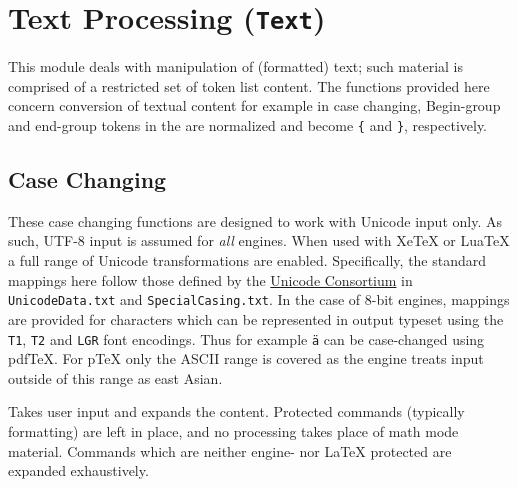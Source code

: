 \documentclass[oneside]{book}
\begin{document}
\chapter{Text Processing (\texttt{Text})}

This module deals with manipulation of (formatted) text; such material is
comprised of a restricted set of token list content. The functions provided
here concern conversion of textual content for example in case changing,
Begin-group and end-group tokens in the 
are normalized and become \verb|{| and \verb|}|, respectively.

\section{Case Changing}

These case changing functions are designed to work with Unicode input only.
As such, UTF-8 input is assumed for \emph{all} engines.
When used with XeTeX or LuaTeX a full range of Unicode transformations
are enabled. Specifically, the standard mappings
here follow those defined by the \href{http://www.unicode.org}
{Unicode Consortium} in \texttt{UnicodeData.txt} and
\texttt{SpecialCasing.txt}. In the case of $8$-bit engines, mappings
are provided for characters which can be represented in output typeset
using the \verb|T1|, \verb|T2| and \verb|LGR| font encodings.
Thus for example \texttt{ä} can be
case-changed using pdfTeX.  For pTeX only the ASCII range is
covered as the engine treats input outside of this range as east Asian.


\begin{function}{\TextExpand}
\begin{syntax}
 
\end{syntax}
Takes user input  and expands the content.
Protected commands (typically formatting) are left in place,
and no processing takes place of math mode material.
Commands which are neither engine- nor \LaTeX{} protected are expanded exhaustively.
\end{function}
\end{document}
